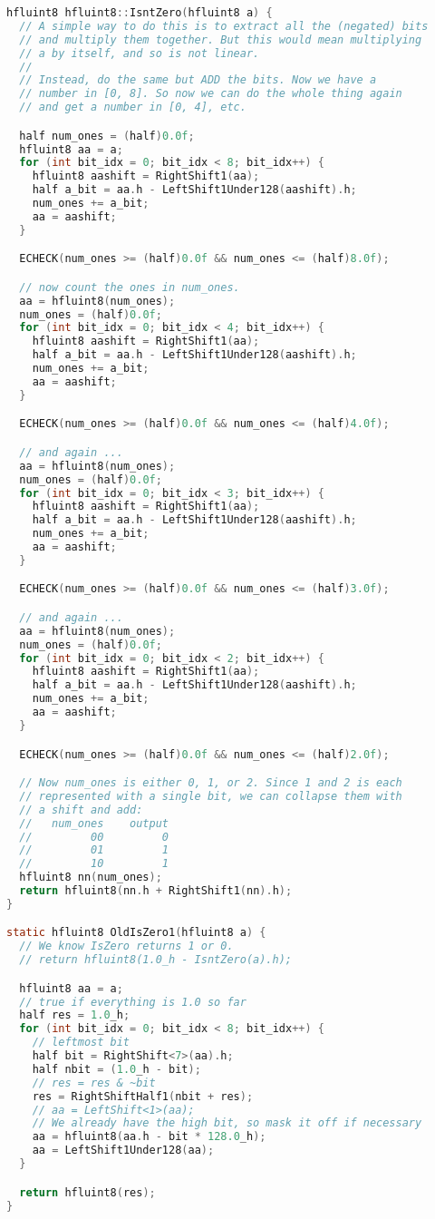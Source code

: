 \begin{lstlisting}[language=C]
hfluint8 hfluint8::IsntZero(hfluint8 a) {
  // A simple way to do this is to extract all the (negated) bits
  // and multiply them together. But this would mean multiplying
  // a by itself, and so is not linear.
  //
  // Instead, do the same but ADD the bits. Now we have a
  // number in [0, 8]. So now we can do the whole thing again
  // and get a number in [0, 4], etc.

  half num_ones = (half)0.0f;
  hfluint8 aa = a;
  for (int bit_idx = 0; bit_idx < 8; bit_idx++) {
    hfluint8 aashift = RightShift1(aa);
    half a_bit = aa.h - LeftShift1Under128(aashift).h;
    num_ones += a_bit;
    aa = aashift;
  }

  ECHECK(num_ones >= (half)0.0f && num_ones <= (half)8.0f);

  // now count the ones in num_ones.
  aa = hfluint8(num_ones);
  num_ones = (half)0.0f;
  for (int bit_idx = 0; bit_idx < 4; bit_idx++) {
    hfluint8 aashift = RightShift1(aa);
    half a_bit = aa.h - LeftShift1Under128(aashift).h;
    num_ones += a_bit;
    aa = aashift;
  }

  ECHECK(num_ones >= (half)0.0f && num_ones <= (half)4.0f);

  // and again ...
  aa = hfluint8(num_ones);
  num_ones = (half)0.0f;
  for (int bit_idx = 0; bit_idx < 3; bit_idx++) {
    hfluint8 aashift = RightShift1(aa);
    half a_bit = aa.h - LeftShift1Under128(aashift).h;
    num_ones += a_bit;
    aa = aashift;
  }

  ECHECK(num_ones >= (half)0.0f && num_ones <= (half)3.0f);

  // and again ...
  aa = hfluint8(num_ones);
  num_ones = (half)0.0f;
  for (int bit_idx = 0; bit_idx < 2; bit_idx++) {
    hfluint8 aashift = RightShift1(aa);
    half a_bit = aa.h - LeftShift1Under128(aashift).h;
    num_ones += a_bit;
    aa = aashift;
  }

  ECHECK(num_ones >= (half)0.0f && num_ones <= (half)2.0f);

  // Now num_ones is either 0, 1, or 2. Since 1 and 2 is each
  // represented with a single bit, we can collapse them with
  // a shift and add:
  //   num_ones    output
  //         00         0
  //         01         1
  //         10         1
  hfluint8 nn(num_ones);
  return hfluint8(nn.h + RightShift1(nn).h);
}

static hfluint8 OldIsZero1(hfluint8 a) {
  // We know IsZero returns 1 or 0.
  // return hfluint8(1.0_h - IsntZero(a).h);

  hfluint8 aa = a;
  // true if everything is 1.0 so far
  half res = 1.0_h;
  for (int bit_idx = 0; bit_idx < 8; bit_idx++) {
    // leftmost bit
    half bit = RightShift<7>(aa).h;
    half nbit = (1.0_h - bit);
    // res = res & ~bit
    res = RightShiftHalf1(nbit + res);
    // aa = LeftShift<1>(aa);
    // We already have the high bit, so mask it off if necessary
    aa = hfluint8(aa.h - bit * 128.0_h);
    aa = LeftShift1Under128(aa);
  }

  return hfluint8(res);
}
\end{lstlisting}


